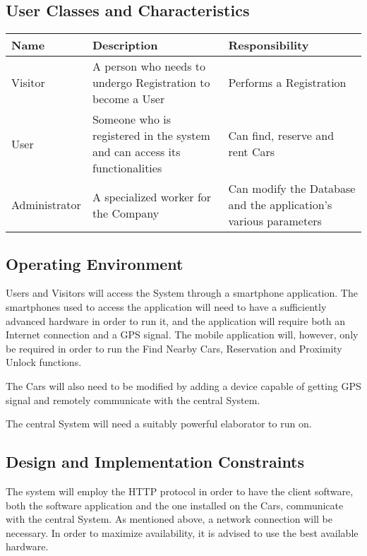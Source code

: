 \subsection{User Classes and Characteristics}
\begin{center}
  \begin{tabular}{|p{}|p{}|p{}|}
    \hline
    \textbf{Name} & \textbf{Description} & \textbf{Responsibility} \\ \hline
    Visitor & A person who needs to undergo Registration to become a User & Performs a Registration \\ \hline
    User & Someone who is registered in the system and can access its functionalities & Can find, reserve and rent Cars \\ \hline
    Administrator & A specialized worker for the Company & Can modify the Database and the application's various parameters \\ \hline
  \end{tabular}
\end{center}

\subsection{Operating Environment}\label{OE}
Users and Visitors will access the System through a smartphone application. The smartphones used to access the application will need to have a sufficiently advanced hardware in order to run it, and the application will require both an Internet connection and a GPS signal. The mobile application will, however, only be required in order to run the Find Nearby Cars, Reservation and Proximity Unlock functions.

The Cars will also need to be modified by adding a device capable of getting GPS signal and remotely communicate with the central System.

The central System will need a suitably powerful elaborator to run on.

\subsection{Design and Implementation Constraints}
The system will employ the HTTP protocol in order to have the client software, both the software application and the one installed on the Cars, communicate with the central System. As mentioned above, a network connection will be necessary. In order to maximize availability, it is advised to use the best available hardware.

